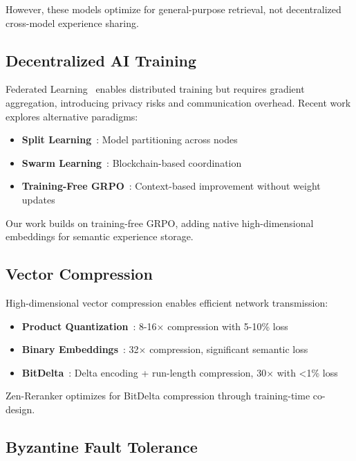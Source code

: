 \documentclass[11pt,a4paper]{article}
\begin{document}
However, these models optimize for general-purpose retrieval, not decentralized cross-model experience sharing.

\subsection{Decentralized AI Training}

Federated Learning~\cite{mcmahan2017federated} enables distributed training but requires gradient aggregation, introducing privacy risks and communication overhead. Recent work explores alternative paradigms:

\begin{itemize}
\item \textbf{Split Learning}~\cite{gupta2018split}: Model partitioning across nodes
\item \textbf{Swarm Learning}~\cite{warnat2021swarm}: Blockchain-based coordination
\item \textbf{Training-Free GRPO}~\cite{tencent2025grpo}: Context-based improvement without weight updates
\end{itemize}

Our work builds on training-free GRPO, adding native high-dimensional embeddings for semantic experience storage.

\subsection{Vector Compression}

High-dimensional vector compression enables efficient network transmission:

\begin{itemize}
\item \textbf{Product Quantization}~\cite{jegou2011pq}: 8-16$\times$ compression with 5-10\% loss
\item \textbf{Binary Embeddings}~\cite{shen2015binary}: 32$\times$ compression, significant semantic loss
\item \textbf{BitDelta}~\cite{hanzo2025bitdelta}: Delta encoding + run-length compression, 30$\times$ with <1\% loss
\end{itemize}

Zen-Reranker optimizes for BitDelta compression through training-time co-design.

\subsection{Byzantine Fault Tolerance}
\end{document}
